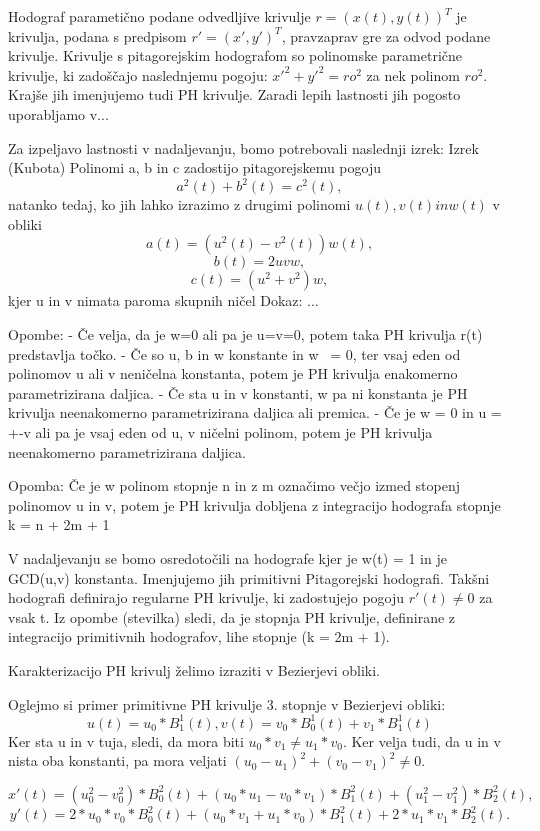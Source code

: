 \documentclass[12pt]{article}
\begin{document}
Hodograf parametično podane odvedljive krivulje $r = (x(t), y(t))^T$ je krivulja, 
podana s predpisom $r' = (x', y')^T$, pravzaprav gre za odvod podane krivulje. 
Krivulje s pitagorejskim hodografom so polinomske parametrične krivulje, 
ki zadoščajo naslednjemu pogoju:
$x'^2 + y'^2 = ro^2$ za nek polinom $ro^2$.
Krajše jih imenjujemo tudi PH krivulje. 
Zaradi lepih lastnosti jih pogosto uporabljamo v...

Za izpeljavo lastnosti v nadaljevanju, bomo potrebovali naslednji izrek:
Izrek (Kubota)
Polinomi a, b in c zadostijo pitagorejskemu pogoju
$$a^2(t) + b^2(t) = c^2(t),$$
natanko tedaj, ko jih lahko izrazimo z drugimi polinomi $u(t), v(t) in w(t)$ v obliki
$$a(t) = (u^2(t) - v^2(t))w(t),$$
$$b(t) = 2uvw,$$
$$c(t) = (u^2 + v^2)w,$$
kjer u in v nimata paroma skupnih ničel
Dokaz: ...

Opombe:
- Če velja, da je w=0 ali pa je u=v=0, potem taka PH krivulja r(t) predstavlja točko.
- Če so u, b in w konstante in w ~= 0, ter vsaj eden od polinomov u ali v neničelna konstanta,
potem je PH krivulja enakomerno parametrizirana daljica.
- Če sta u in v konstanti, w pa ni konstanta je PH krivulja neenakomerno parametrizirana daljica ali premica.
- Če je w = 0 in u = +-v ali pa je vsaj eden od u, v ničelni polinom, 
potem je PH krivulja neenakomerno parametrizirana daljica. 

Opomba:
Če je w polinom stopnje n in z m označimo večjo izmed stopenj polinomov u in v, 
potem je PH krivulja dobljena z integracijo hodografa stopnje k = n + 2m + 1

V nadaljevanju se bomo osredotočili na hodografe kjer je w(t) = 1 in je GCD(u,v) konstanta.
Imenjujemo jih primitivni Pitagorejski hodografi. 
Takšni hodografi definirajo regularne PH krivulje, ki zadostujejo pogoju $r'(t) \neq 0$ za vsak t. 
Iz opombe (stevilka) sledi, da je stopnja PH krivulje, definirane z integracijo
primitivnih hodografov, lihe stopnje (k = 2m + 1).

Karakterizacijo PH krivulj želimo izraziti v Bezierjevi obliki.

Oglejmo si primer primitivne PH krivulje 3. stopnje v Bezierjevi obliki:
$$u(t) = u_0*B^1_1(t), v(t) = v_0*B^1_0(t) + v_1*B^1_1(t)$$
Ker sta u in v tuja, sledi, da mora biti $u_0*v_1 \neq u_1*v_0$. Ker velja tudi,
da u in v nista oba konstanti, pa mora veljati $(u_0 - u_1)^2 + (v_0 - v_1)^2 \neq 0$.

$$x'(t) = (u_0^2 - v_0^2)*B_0^2(t) + (u_0*u_1 - v_0*v_1)*B_1^2(t) + (u_1^2 - v_1^2)*B_2^2(t),$$
$$y'(t) = 2*u_0*v_0*B_0^2(t) + (u_0*v_1 + u_1*v_0)*B_1^2(t) + 2*u_1*v_1*B_2^2(t).$$
\end{document}
